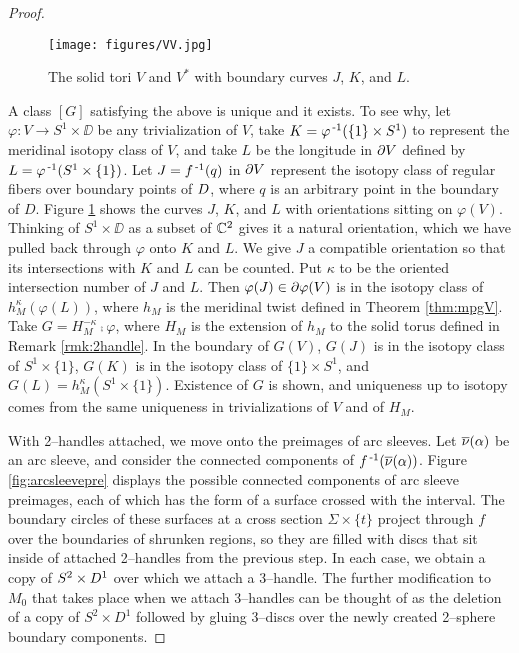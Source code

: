 \begin{proof}
	\begin{figure}
		\centering
		\captionsetup{justification=centering}
		\caption{The solid tori $V$ and $V^*$ with boundary curves $J$, $K$, and $L$.}
		\texttt{[image: figures/VV.jpg]}
		\label{fig:VV*}
	\end{figure}
	
	A class $[G]$ satisfying the above is unique and it exists.
	To see why, let $\varphi:V\to S^1\times\DD$ be any trivialization of $V$, take $K=\varphi^{\,\text{-}1}(\{1\}\times S^1)$ to represent the meridinal isotopy class of $V$, and take $L$ be the longitude in $\partial V$ defined by $L=\varphi^{\,\text{-}1}(S^1\times\{1\})$.
	Let $J=f^{\,\text{-}1}(q)$ in $\partial V$ represent the isotopy class of regular fibers over boundary points of $D$, where $q$ is an arbitrary point in the boundary of $D$.	
	Figure \ref{fig:VV*} shows the curves $J$, $K$, and $L$ with orientations sitting on $\varphi(V)$.
	Thinking of $S^1\times\DD$ as a subset of $\mathbb{C}^2$ gives it a natural orientation, which we have pulled back through $\varphi$ onto $K$ and $L$.
	We give $J$ a compatible orientation so that its intersections with $K$ and $L$ can be counted.
	Put $\kappa$ to be the oriented intersection number of $J$ and $L$.
	Then $\varphi(J)\in \partial\varphi(V)$ is in the isotopy class of $h_M^{\kappa}(\varphi(L))$, where $h_M$ is the meridinal twist defined in Theorem \ref{thm:mpgV}.
	Take $G=H_M^{-\kappa}\comp\varphi$, where $H_M$ is the extension of $h_M$ to the solid torus defined in Remark \ref{rmk:2handle}.
	In the boundary of $G(V)$, $G(J)$ is in the isotopy class of $S^1\times\{1\}$, $G(K)$ is in the isotopy class of $\{1\}\times S^1$, and $G(L)=h_M^\kappa(S^1\times\{1\})$.
	Existence of $G$ is shown, and uniqueness up to isotopy comes from the same uniqueness in trivializations of $V$ and of $H_M$.
		
	With 2--handles attached, we move onto the preimages of arc sleeves.
	Let $\overline{\nu}(\alpha)$ be an arc sleeve, and consider the connected components of $f^{\,\text{-}1}(\overline{\nu}(\alpha))$.
	Figure \ref{fig:arcsleevepre} displays the possible connected components of arc sleeve preimages, each of which has the form of a surface crossed with the interval.
	The boundary circles of these surfaces at a cross section $\Sigma\times\{t\}$ project through $f$ over the boundaries of shrunken regions, so they are filled with discs that sit inside of attached 2--handles from the previous step.
	In each case, we obtain a copy of $S^2\times D^1$ over which we attach a 3--handle.
	The further modification to $M_0$ that takes place when we attach 3--handles can be thought of as the deletion of a copy of $S^2\times D^1$ followed by gluing 3--discs over the newly created 2--sphere boundary components.


\end{proof}
